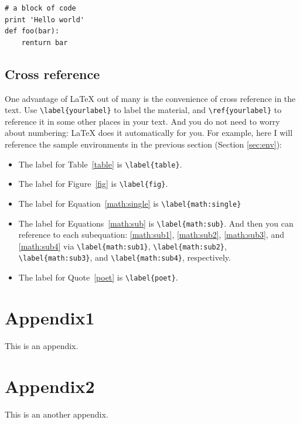 \documentclass[draft]{emory}
\begin{document}
\begin{Verbatim}
# a block of code
print 'Hello world'
def foo(bar):
    renturn bar
\end{Verbatim}


\section{Cross reference}
One advantage of \LaTeX{} out of many is the convenience of cross reference in
the text. Use \Verb|\label{yourlabel}| to label the material, and \Verb|\ref{yourlabel}|
to reference it in some other places in your text. And you do not need to worry
about numbering: \LaTeX{} does it automatically for you. For example, here
I will reference the sample environments in the previous section (Section 
\ref{sec:env}):
\begin{itemize}
\item The label for Table~\ref{table} is \Verb|\label{table}|.
\item The label for Figure~\ref{fig} is \Verb|\label{fig}|.
\item The label for Equation~\ref{math:single} is \Verb|\label{math:single}|
\item The label for Equations~\ref{math:sub} is \Verb|\label{math:sub}|. And then
      you can reference to each subequation: \ref{math:sub1}, \ref{math:sub2}, 
      \ref{math:sub3}, and \ref{math:sub4} via \Verb|\label{math:sub1}|,
      \Verb|\label{math:sub2}|, \Verb|\label{math:sub3}|, and \Verb|\label{math:sub4}|,
      respectively.
\item The label for Quote~\ref{poet} is \Verb|\label{poet}|.
\end{itemize}


\appendix
\renewcommand{\chaptername}{Appendix}

\chapter{Appendix1}
This is an appendix.

\chapter{Appendix2}
This is an another appendix.
\end{document}
